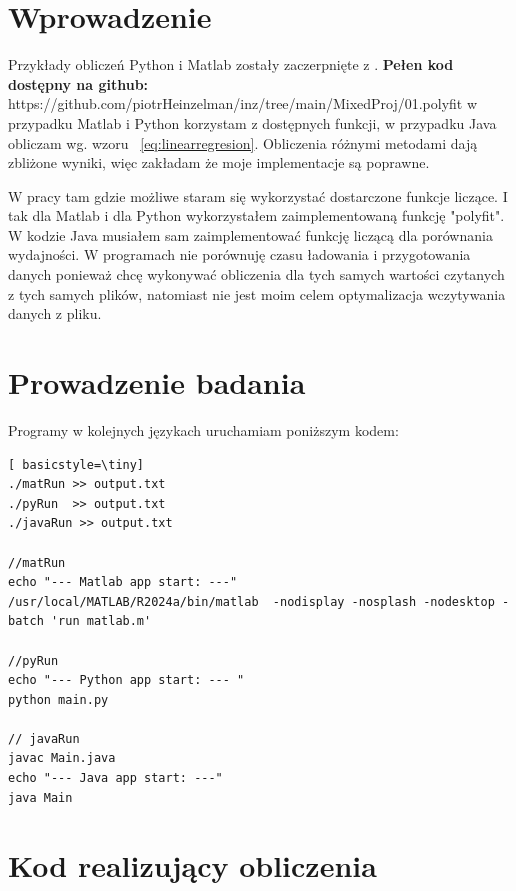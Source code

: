 
\section{Wprowadzenie}
Przykłady obliczeń Python i Matlab zostały zaczerpnięte z \cite{ossowski2023}.
\textbf{Pełen kod dostępny na github:} https://github.com/piotrHeinzelman/inz/tree/main/MixedProj/01.polyfit
w przypadku Matlab i Python korzystam z dostępnych funkcji, w przypadku Java obliczam wg. wzoru ~\ref{eq:linearregresion}. Obliczenia różnymi metodami dają zbliżone wyniki, więc zakładam że moje implementacje są poprawne. 

 
W pracy tam gdzie możliwe staram się wykorzystać dostarczone funkcje liczące. I tak dla Matlab i dla Python wykorzystałem zaimplementowaną funkcję "polyfit". W kodzie Java musiałem sam zaimplementować funkcję liczącą dla porównania wydajności. W programach nie porównuję czasu ładowania i przygotowania danych ponieważ chcę wykonywać obliczenia dla tych samych wartości czytanych z tych samych plików, natomiast nie jest moim celem optymalizacja wczytywania danych z pliku.

\newpage
\section{Prowadzenie badania}
Programy w kolejnych językach uruchamiam poniższym kodem:

\begin{lstlisting}[ basicstyle=\tiny]
./matRun >> output.txt
./pyRun  >> output.txt
./javaRun >> output.txt

//matRun
echo "--- Matlab app start: ---"
/usr/local/MATLAB/R2024a/bin/matlab  -nodisplay -nosplash -nodesktop -batch 'run matlab.m'

//pyRun
echo "--- Python app start: --- "
python main.py

// javaRun
javac Main.java 
echo "--- Java app start: ---"
java Main
\end{lstlisting}


\section{Kod realizujący obliczenia}


